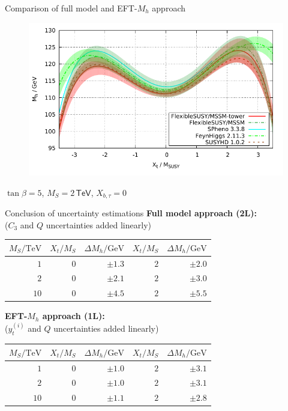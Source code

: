 \documentclass[hyperref={pdfpagelabels=false},ngerman]{beamer}
\newcommand{\eh}[1]{\,\mathsf{#1}}
\renewcommand{\emph}{\textbf}
\begin{document}
\begin{frame}{Comparison of full model and EFT-$M_h$ approach}
  \begin{figure}
    \centering
    \includegraphics[width=\textwidth]{plots/xt_MSSM_MS-2000_uncertainty}
  \end{figure}
  $\tan\beta = 5$, $M_S = 2\eh{TeV}$, $X_{b,\tau} = 0$
\end{frame}

\begin{frame}{Conclusion of uncertainty estimations}
  \emph{Full model approach (2L):}\\
  ($C_3$ and $Q$ uncertainties added linearly)
  \begin{table}
    \centering
    \begin{tabular}{rrr|rr}
      $M_S / \text{TeV}$ & $X_t / M_S$ & $\Delta M_h / \text{GeV}$ & $X_t / M_S$ & $\Delta M_h / \text{GeV}$ \\
      \midrule
      $1$  & $0$ & $\pm 1.3$ & $2$ & $\pm 2.0$\\
      $2$  & $0$ & $\pm 2.1$ & $2$ & $\pm 3.0$\\
      $10$ & $0$ & $\pm 4.5$ & $2$ & $\pm 5.5$\\
    \end{tabular}
  \end{table}
  \emph{EFT-$M_h$ approach (1L):}\\
  ($y_t^{(i)}$ and $Q$ uncertainties added linearly)
  \begin{table}
    \centering
    \begin{tabular}{rrr|rr}
      $M_S / \text{TeV}$ & $X_t / M_S$ & $\Delta M_h / \text{GeV}$ & $X_t / M_S$ & $\Delta M_h / \text{GeV}$ \\
      \midrule
      $1$  & $0$ & $\pm 1.0$ & $2$ & $\pm 3.1$\\
      $2$  & $0$ & $\pm 1.0$ & $2$ & $\pm 3.1$\\
      $10$ & $0$ & $\pm 1.1$ & $2$ & $\pm 2.8$\\
    \end{tabular}
  \end{table}
\end{frame}
\end{document}
